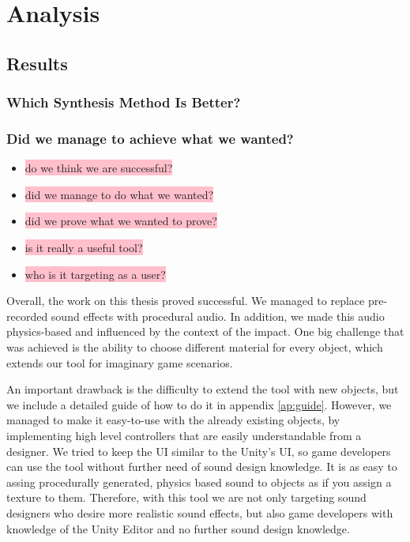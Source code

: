 \chapter{Analysis}\label{ch:analysis}

\section{Results}

\subsection{Which Synthesis Method Is Better?}

\subsection{Did we manage to achieve what we wanted?}
\begin{itemize}
\item \colorbox{pink}{do we think we are successful?}
\item \colorbox{pink}{did we manage to do what we wanted?}
\item \colorbox{pink}{did we prove what we wanted to prove?}
\item \colorbox{pink}{is it really a useful tool?}
\item \colorbox{pink}{who is it targeting as a user?}
\end{itemize} 

Overall, the work on this thesis proved successful. We managed to replace pre-recorded sound effects with procedural audio. In addition, we made this audio physics-based and influenced by the context of the impact. One big challenge that was achieved is the ability to choose different material for every object, which extends our tool for imaginary game scenarios. 

An important drawback is the difficulty to extend the tool with new objects, but we include a detailed guide of how to do it in appendix \ref{ap:guide}. However, we managed to make it easy-to-use with the already existing objects, by implementing high level controllers that are easily understandable from a designer. We tried to keep the UI similar to the Unity's UI, so game developers can use the tool without further need of sound design knowledge. It is as easy to assing procedurally generated, physics based sound to objects as if you assign a texture to them. Therefore, with this tool we are not only targeting sound designers who desire more realistic sound effects, but also game developers with knowledge of the Unity Editor and no further sound design knowledge.

